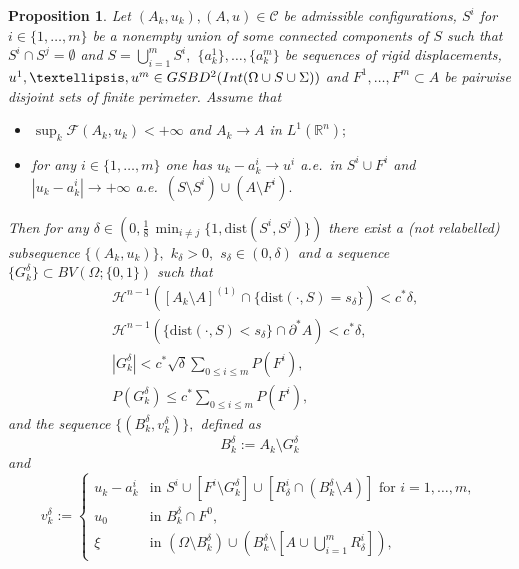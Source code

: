 \documentclass[reqno]{amsart}
\numberwithin{equation}{section}
\theoremstyle{plain}
\newtheorem{proposition}[theorem]{Proposition}
\theoremstyle{definition}
\newcommand{\R}{\mathbb{R}}
\newcommand{\cH}{\mathcal{H}}
\newcommand{\cF}{\mathcal{F}}
\newcommand{\p}{\partial}
\newcommand{\dist}{\mathrm{dist}}
\newcommand{\admissible}{\mathcal{C}}
\newcommand{\substrate}{S}
\newcommand{\Ins}[1]{{\rm Int}{(#1\cup \substrate\cup \Sigma)}}
\begin{document}
 \begin{proposition}\label{prop:pass_to_good_seq_compacte}
Let $(A_k,u_k),(A,u)\in\admissible$ be admissible configurations, $S^i$ for $i\in\{1,\ldots,m\}$ be a nonempty union of some connected components of $S$ such that $S^i\cap S^j =  \emptyset$ and $S = \bigcup_{i=1}^m S^i,$ $\{a_k^1\},\ldots,\{a_k^m\}$ be sequences of rigid displacements, $u^1,\ldots,u^m\in GSBD^2(\Ins{\Omega})$ and  
$F^1,\ldots,F^m\subset A$ be pairwise disjoint sets of finite perimeter. Assume that 
\begin{itemize}[left=12pt]
\item  $\sup_k\cF(A_k,u_k)<+\infty$ and $A_k\to A$ in $L^1(\R^n);$
 
\item for any $i\in\{1,\ldots,m\}$  one has $u_k - a_k^i \to u^i$ a.e.\ in $S^i \cup F^i$  and 
$|u_k - a_k^i |\to +\infty$ a.e.\ $(S\setminus S^i) \cup (A\setminus F^i).$
\end{itemize}
Then for any $\delta\in(0,\frac18\,\min_{i\ne j}\{1,\dist(S^i,S^j)\})$ there exist a (not relabelled) subsequence $\{(A_k,u_k)\},$ $k_\delta>0,$ $s_\delta\in(0,\delta)$ 
and a sequence $\{G_k^\delta\} \subset BV(\Omega;\{0,1\})$ 
such that
\begin{subequations}
\begin{align}
& \cH^{n-1}([A_k\setminus A]^{(1)}\cap \{\dist(\cdot, S) = s_\delta\}) < c^*\delta, \label{good_cut_sk}\\
%
& \cH^{n-1}(\{\dist(\cdot, S) < s_\delta\} \cap \p^*A)<c^*\delta, \label{good_cut_skper}\\
%
& |G_k^\delta| < c^*\sqrt{\delta} \sum_{0\le i\le m} P(F^i), \label{vol_est_Gk}\\
%
& P(G_k^\delta) \le c^*\sum_{0\le i\le m} P(F^i), \label{per_est_Gk}
\end{align}
\end{subequations}
%
and the sequence $\{(B_k^\delta,v_k^\delta)\},$ defined as 
\begin{equation}\label{def_BBkdelta}
B_k^\delta:=A_k\setminus G_k^\delta 
\end{equation}
%
and
\begin{equation}\label{def_vvkdelta}
v_k^\delta:=
\begin{cases}
u_k - a_k^i & \text{in $S^i \cup [F^i\setminus G_k^\delta] \cup [R_\delta^i \cap (B_k^\delta\setminus A)]$ for $i=1,\ldots,m,$} \\
%
u_0 & \text{in $B_k^\delta \cap F^0,$} \\
%
\xi &\text{in $(\Omega\setminus B_k^\delta)\cup (B_k^\delta \setminus [A\cup \bigcup_{i=1}^m R_\delta^i]),$}

\end{cases}
\end{equation}
\end{proposition}
\end{document}

